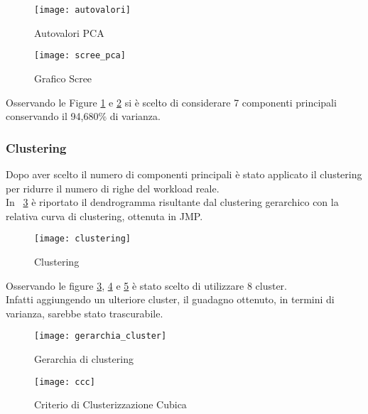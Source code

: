 \begin{figure}[!htbp]
  \centering
  \texttt{[image: autovalori]}
  \caption{Autovalori PCA}
  \label{autovalori}
\end{figure}
\clearpage

\begin{figure}[!htbp]
  \centering
  \texttt{[image: scree\_pca]}
  \caption{Grafico Scree}
  \label{scree_pca}
\end{figure}

Osservando le Figure \ref{autovalori} e \ref{scree_pca} si è scelto di considerare
7 componenti principali conservando il 94,680\% di varianza.

\clearpage

\subsubsection{Clustering}
Dopo aver scelto il numero di componenti principali è stato applicato il clustering
per ridurre il numero di righe del workload reale.\\
In \figurename~\ref{clustering} è riportato il dendrogramma risultante dal
clustering gerarchico con la relativa curva di clustering, ottenuta in JMP.\\

\begin{figure}[!htbp]
  \centering
  \texttt{[image: clustering]}
  \caption{Clustering}
  \label{clustering}
\end{figure}
\clearpage

Osservando le figure \ref{clustering}, \ref{gerarchia_cluster} e \ref{ccc}
è stato scelto di utilizzare 8 cluster.\\
Infatti aggiungendo un ulteriore cluster, il guadagno ottenuto, in termini di varianza,
sarebbe stato trascurabile.\\

\begin{minipage}{\linewidth}
  \centering
  \begin{minipage}{0.48\linewidth}
    \begin{figure}[H]
      \texttt{[image: gerarchia\_cluster]}
      \label{gerarchia_cluster}
      \caption{Gerarchia di clustering}
    \end{figure}
  \end{minipage}
  \begin{minipage}{0.48\linewidth}
    \begin{figure}[H]
      \texttt{[image: ccc]}
      \label{ccc}
      \caption{Criterio di Clusterizzazione Cubica}
    \end{figure}
  \end{minipage}
\end{minipage}


